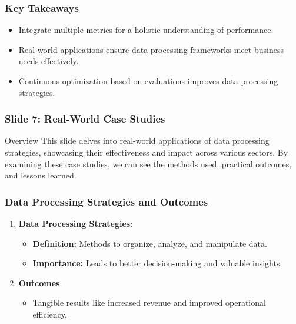 \documentclass[aspectratio=169]{beamer}
\begin{document}
\begin{frame}[fragile]
    \frametitle{Key Takeaways}
    \begin{itemize}
        \item Integrate multiple metrics for a holistic understanding of performance.
        \item Real-world applications ensure data processing frameworks meet business needs effectively.
        \item Continuous optimization based on evaluations improves data processing strategies.
    \end{itemize}
\end{frame}

\begin{frame}[fragile]
    \frametitle{Slide 7: Real-World Case Studies}
    \begin{block}{Overview}
        This slide delves into real-world applications of data processing strategies, showcasing their effectiveness and impact across various sectors. 
        By examining these case studies, we can see the methods used, practical outcomes, and lessons learned.
    \end{block}
\end{frame}

\begin{frame}[fragile]
    \frametitle{Data Processing Strategies and Outcomes}
    \begin{enumerate}
        \item \textbf{Data Processing Strategies}:
            \begin{itemize}
                \item \textbf{Definition:} Methods to organize, analyze, and manipulate data.
                \item \textbf{Importance:} Leads to better decision-making and valuable insights.
            \end{itemize}
        
        \item \textbf{Outcomes}:
            \begin{itemize}
                \item Tangible results like increased revenue and improved operational efficiency.
            \end{itemize}
    \end{enumerate}
\end{frame}
\end{document}
